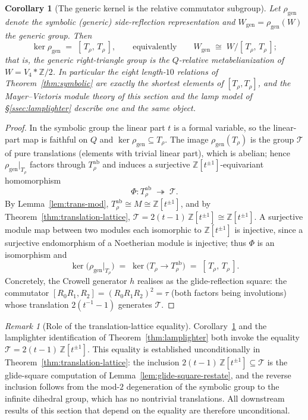 \documentclass[11pt]{article}
\theoremstyle{plain}
\newtheorem{corollary}[theorem]{Corollary}
\theoremstyle{definition}
\theoremstyle{remark}
\newtheorem{remark}[theorem]{Remark}
\begin{document}
\begin{corollary}[The generic kernel is the relative commutator
subgroup]
\label{cor:generic-kernel}
Let $\rho_{\mathrm{gen}}$ denote the symbolic (generic) side-reflection
representation and $W_{\mathrm{gen}} = \rho_{\mathrm{gen}}(W)$ the
generic group.  Then
\[
\ker \rho_{\mathrm{gen}} \;=\; [\,T_\rho,\, T_\rho\,],
\qquad\text{equivalently}\qquad
W_{\mathrm{gen}} \;\cong\; W \big/ [\,T_\rho,\, T_\rho\,];
\]
that is, the generic right-triangle group is the $Q$-relative
metabelianization of $W = V_4 * \mathbb{Z}/2$.  In particular the eight
length-$10$ relations of Theorem~\ref{thm:symbolic} are exactly the
shortest elements of $[T_\rho, T_\rho]$, and the Mayer--Vietoris module
theory of this section and the lamp model of \S\ref{ssec:lamplighter}
describe one and the same object.
\end{corollary}

\begin{proof}
In the symbolic group the linear part $t$ is a formal variable, so the
linear-part map is faithful on $Q$ and
$\ker \rho_{\mathrm{gen}} \subseteq T_\rho$.  The image
$\rho_{\mathrm{gen}}(T_\rho)$ is the group $\mathcal{T}$ of pure
translations (elements with trivial linear part), which is abelian;
hence $\rho_{\mathrm{gen}}|_{T_\rho}$ factors through
$T_\rho^{\mathrm{ab}}$ and induces a surjective
$\mathbb{Z}[t^{\pm 1}]$-equivariant homomorphism
\[
\Phi \colon T_\rho^{\mathrm{ab}} \;\twoheadrightarrow\; \mathcal{T}.
\]
By Lemma~\ref{lem:trans-mod}, $T_\rho^{\mathrm{ab}} \cong M \cong
\mathbb{Z}[t^{\pm 1}]$, and by Theorem~\ref{thm:translation-lattice},
$\mathcal{T} = 2(t-1)\,\mathbb{Z}[t^{\pm 1}] \cong \mathbb{Z}[t^{\pm 1}]$.
A surjective module map between two modules each isomorphic to
$\mathbb{Z}[t^{\pm 1}]$ is injective, since a surjective endomorphism of
a Noetherian module is injective; thus $\Phi$ is an isomorphism and
\[
\ker\bigl(\rho_{\mathrm{gen}}|_{T_\rho}\bigr)
\;=\; \ker\bigl(T_\rho \to T_\rho^{\mathrm{ab}}\bigr)
\;=\; [\,T_\rho,\, T_\rho\,].
\]
Concretely, the Crowell generator $h$ realises as the glide-reflection
square: the commutator $[R_0R_1, R_2] = (R_0R_1R_2)^2 = \tau$ (both
factors being involutions) whose translation $2(t^{-1}-1)$ generates
$\mathcal{T}$.
\end{proof}

\begin{remark}[Role of the translation-lattice equality]
\label{rem:lattice-keystone}
Corollary~\ref{cor:generic-kernel} and the lamplighter identification of
Theorem~\ref{thm:lamplighter} both invoke the equality
$\mathcal{T} = 2(t-1)\,\mathbb{Z}[t^{\pm 1}]$.  This equality is
established unconditionally in Theorem~\ref{thm:translation-lattice}:
the inclusion $2(t-1)\,\mathbb{Z}[t^{\pm 1}] \subseteq \mathcal{T}$ is
the glide-square computation of Lemma~\ref{lem:glide-square-restate}, and the
reverse inclusion follows from the mod-$2$ degeneration of the symbolic
group to the infinite dihedral group, which has no nontrivial
translations.  All downstream results of this section that depend on the
equality are therefore unconditional.
\end{remark}
\end{document}
